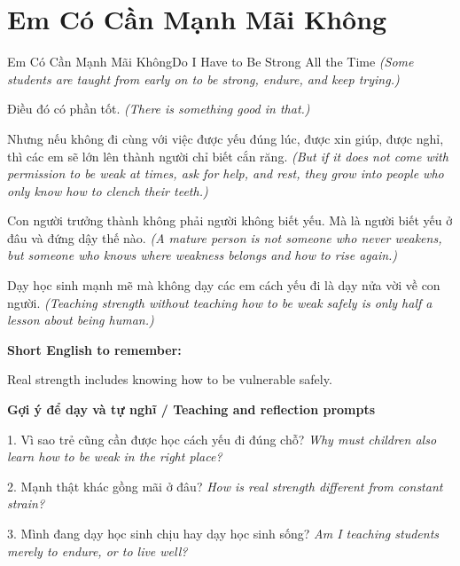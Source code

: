 \section{Em Có Cần Mạnh Mãi Không}
\begin{truyen}{Em Có Cần Mạnh Mãi Không}{Do I Have to Be Strong All the Time}
\textit{(Some students are taught from early on to be strong, endure, and keep trying.)}

Điều đó có phần tốt.
\textit{(There is something good in that.)}

Nhưng nếu không đi cùng với việc được yếu đúng lúc, được xin giúp, được nghỉ, thì các em sẽ lớn lên thành người chỉ biết cắn răng.
\textit{(But if it does not come with permission to be weak at times, ask for help, and rest, they grow into people who only know how to clench their teeth.)}

Con người trưởng thành không phải người không biết yếu. Mà là người biết yếu ở đâu và đứng dậy thế nào.
\textit{(A mature person is not someone who never weakens, but someone who knows where weakness belongs and how to rise again.)}

\end{truyen}

\begin{baihoc}
Dạy học sinh mạnh mẽ mà không dạy các em cách yếu đi là dạy nửa vời về con người.
\textit{(Teaching strength without teaching how to be weak safely is only half a lesson about being human.)}
\end{baihoc}

\begin{ghinhoanh}
\textbf{Short English to remember:}

Real strength includes knowing how to be vulnerable safely.

\end{ghinhoanh}

\begin{tuhocnhanh}
\textbf{Gợi ý để dạy và tự nghĩ / Teaching and reflection prompts}

1. Vì sao trẻ cũng cần được học cách yếu đi đúng chỗ? \textit{Why must children also learn how to be weak in the right place?}

2. Mạnh thật khác gồng mãi ở đâu? \textit{How is real strength different from constant strain?}

3. Mình đang dạy học sinh chịu hay dạy học sinh sống? \textit{Am I teaching students merely to endure, or to live well?}
\end{tuhocnhanh}
\ngancach

